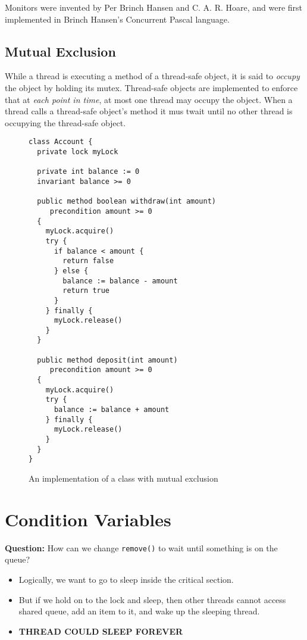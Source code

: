 Monitors were invented by Per Brinch Hansen and C. A. R. Hoare, and were first
implemented in Brinch Hansen's Concurrent Pascal language.

\subsection{Mutual Exclusion}
While a thread is executing a method of a thread-safe object, it is said to
\emph{occupy} the object by holding its mutex. Thread-safe objects are
implemented to enforce that at \emph{each point in time}, at most one thread may
occupy the object. When a thread calls a thread-safe object's method it mus
twait until no other thread is occupying the thread-safe object.

\begin{figure}[h]
    \begin{verbatim}
class Account {
  private lock myLock

  private int balance := 0
  invariant balance >= 0

  public method boolean withdraw(int amount)
     precondition amount >= 0
  {
    myLock.acquire()
    try {
      if balance < amount {
        return false
      } else {
        balance := balance - amount
        return true
      }
    } finally {
      myLock.release()
    }
  }

  public method deposit(int amount)
     precondition amount >= 0
  {
    myLock.acquire()
    try {
      balance := balance + amount
    } finally {
      myLock.release()
    }
  }
}
    \end{verbatim}
    \caption{An implementation of a class with mutual exclusion}
\end{figure}



\section{Condition Variables}
\textbf{Question:} How can we change \texttt{remove()} to wait until something
is on the queue?
\begin{itemize}
    \item Logically, we want to go to sleep inside the critical section.
    \item But if we hold on to the lock and sleep, then other threads cannot
        access shared queue, add an item to it, and wake up the sleeping thread.
    \item \textbf{THREAD COULD SLEEP FOREVER}
\end{itemize}

